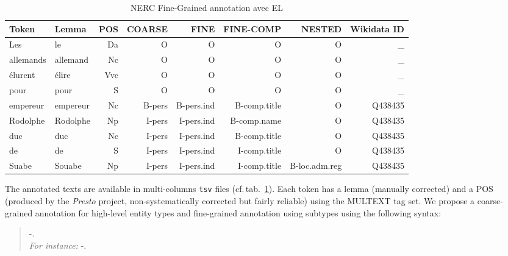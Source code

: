 \begin{table}[!htp]
    \centering\scriptsize
    \begin{tabular}{llrrrrrr}
        \toprule
        Token     & Lemma    & POS & COARSE & FINE       & FINE-COMP    & NESTED        & Wikidata ID \\
        \midrule
        Les       & le       & Da  & O      & O          & O            & O             & \_          \\
        allemands & allemand & Nc  & O      & O          & O            & O             & \_          \\
        élurent   & élire    & Vvc & O      & O          & O            & O             & \_          \\
        pour      & pour     & S   & O      & O          & O            & O             & \_          \\
        empereur  & empereur & Nc  & B-pers & B-pers.ind & B-comp.title & O             & Q438435     \\
        Rodolphe  & Rodolphe & Np  & I-pers & I-pers.ind & B-comp.name  & O             & Q438435     \\
        duc       & duc      & Nc  & I-pers & I-pers.ind & B-comp.title & O             & Q438435     \\
        de        & de       & S   & I-pers & I-pers.ind & I-comp.title & O             & Q438435     \\
        Suabe     & Souabe   & Np  & I-pers & I-pers.ind & I-comp.title & B-loc.adm.reg & Q438435     \\
        \bottomrule
    \end{tabular}
    \caption{NERC Fine-Grained annotation avec EL}
    \label{tab:data}
\end{table}

The annotated texts are available in multi-columns \texttt{tsv} files (cf.\,tab.~\ref{tab:data}). Each token has a lemma (manually corrected) and a POS (produced by the \textit{Presto} project, non-systematically corrected but fairly reliable) using the MULTEXT tag set. We propose a coarse-grained annotation for high-level entity types and fine-grained annotation using subtypes using the following syntax:
\begin{quote}
    \texttt{}-\texttt{}.\texttt{} \\
    \textit{For instance: } \texttt{}-\texttt{}.\texttt{}
\end{quote}

